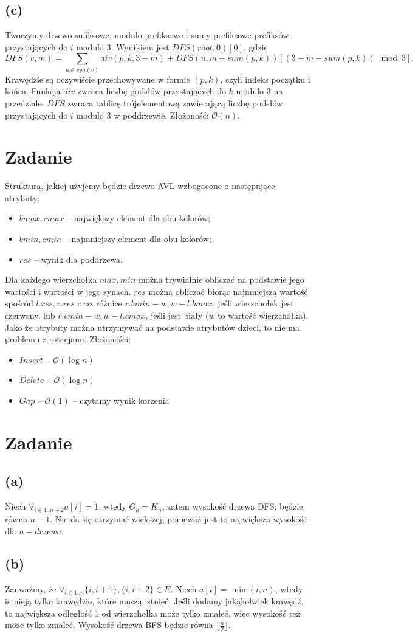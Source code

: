 \documentclass[12pt, a4paper]{article}
\newcommand{\MCALO}{\mathcal{O}}
\newcounter{zadanie}
\newcommand{\zadanie}{\addtocounter{zadanie}{1}\section*{Zadanie \arabic{zadanie}}}
\begin{document}
\subsection*{(c)}
Tworzymy drzewo sufiksowe, modulo prefiksowe i sumy prefiksowe prefiksów
przystających do $i$ modulo $3$. Wynikiem jest $DFS(root, 0)[0]$, gdzie
$$DFS(v, m) = \sum_{u \in syn(v)} div(p, k, 3 - m) + DFS(u, m + sum(p,k))[(3
- m - sum(p,k))\mod3].$$
Krawędzie są oczywiście przechowywane w formie $(p,k)$, czyli indeks początku
i końca. Funkcja $div$ zwraca liczbę podsłów przystających do $k$ modulo $3$ na
przedziale. $DFS$ zwraca tablicę trójelementową zawierającą liczbę podsłów
przystających do $i$ modulo $3$ w poddrzewie.
Złożoność: $\MCALO(n)$.

\zadanie{}
Strukturą, jakiej użyjemy będzie drzewo AVL wzbogacone o następujące atrybuty:
\begin{itemize}
  \item $bmax,cmax$ -- największy element dla obu kolorów;
  \item $bmin,cmin$ -- najmniejszy element dla obu kolorów;
  \item $res$ -- wynik dla poddrzewa.
\end{itemize}
Dla każdego wierzchołka $max, min$ można trywialnie obliczać na podstawie jego
wartości i wartości w jego synach. $res$ można obliczać biorąc najmniejszą
wartość spośród $l.res, r.res$ oraz różnice $r.bmin - w, w - l.bmax$, jeśli
wierzchołek jest czerwony, lub $r.cmin - w, w - l.cmax$, jeśli jest biały ($w$
to wartość wierzchołka). Jako że atrybuty można utrzymywać na podstawie
atrybutów dzieci, to nie ma problemu z rotacjami.
Złożoności:
\begin{itemize}
  \item $\mathit{Insert}$ -- $\MCALO(\log{n})$
  \item $\mathit{Delete}$ -- $\MCALO(\log{n})$
  \item $\mathit{Gap}$ -- $\MCALO(1)$ -- czytamy wynik korzenia
\end{itemize}

\zadanie{}
\subsection*{(a)}
Niech $\forall_{i\in{1..n+2}} a[i] = 1$, wtedy $G_a = K_n$, zatem wysokość drzewa
DFS, będzie równa $n-1$. Nie da się otrzymać większej, ponieważ jest to
największa wysokość dla $n-drzewa$.

\subsection*{(b)}
Zauważmy, że $\forall_{i\in{1..n}} \{i,i+1\}, \{i,i+2\} \in E$. Niech $a[i]
= \min(i, n)$, wtedy istnieją tylko krawędzie, które muszą istnieć. Jeśli dodamy
jakąkolwiek krawędź, to największa odległość $1$ od wierzchołka może tylko
zmaleć, więc wysokość też może tylko zmaleć. Wysokość drzewa BFS będzie równa
$\lfloor\frac{n}{2}\rfloor$.
\end{document}
